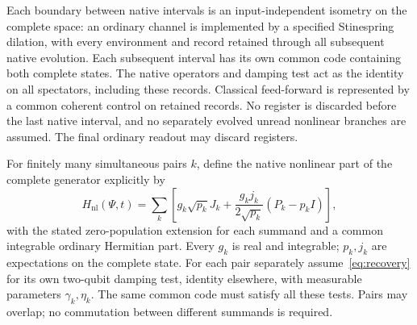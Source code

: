 \documentclass[11pt]{article}
\begin{document}
Each boundary between native intervals is an input-independent isometry on the complete space: an ordinary channel is implemented by a specified Stinespring dilation, with every environment and record retained through all subsequent native evolution. Each subsequent interval has its own common code containing both complete states. The native operators and damping test act as the identity on all spectators, including these records. Classical feed-forward is represented by a common coherent control on retained records. No register is discarded before the last native interval, and no separately evolved unread nonlinear branches are assumed. The final ordinary readout may discard registers.

For finitely many simultaneous pairs $k$, define the native nonlinear part of the complete generator explicitly by
\begin{equation}
 H_{\mathrm{nl}}(\Psi,t)=\sum_k\left[
 g_k\sqrt{p_k}J_k+\frac{g_kj_k}{2\sqrt{p_k}}(P_k-p_kI)\right],\label{eq:multi}
\end{equation}
with the stated zero-population extension for each summand and a common integrable ordinary Hermitian part. Every $g_k$ is real and integrable; $p_k,j_k$ are expectations on the complete state. For each pair separately assume~\eqref{eq:recovery} for its own two-qubit damping test, identity elsewhere, with measurable parameters $\gamma_k,\eta_k$. The same common code must satisfy all these tests. Pairs may overlap; no commutation between different summands is required.
\end{document}
